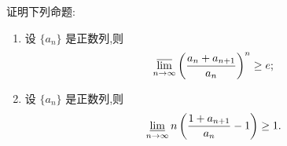 \documentclass[../数学分析培优讲义.tex]{subfiles}
\begin{document}
\begin{example}
证明下列命题:
\begin{enumerate}[label=(\arabic*)]
  \item 设 $\{a_n\}$ 是正数列,则
  \[
  \varlimsup\limits_{n\to\infty}
  \left(\dfrac{a_n+a_{n+1}}{a_n}\right)^n
  \geq e;
  \]
  \item 设 $\{a_n\}$ 是正数列,则
  \[
  \varliminf\limits_{n\to\infty}
  n\left(\dfrac{1+a_{n+1}}{a_n}-1\right)
  \geq1.
  \]
\end{enumerate}
\end{example}
\exampleblank
\end{document}
